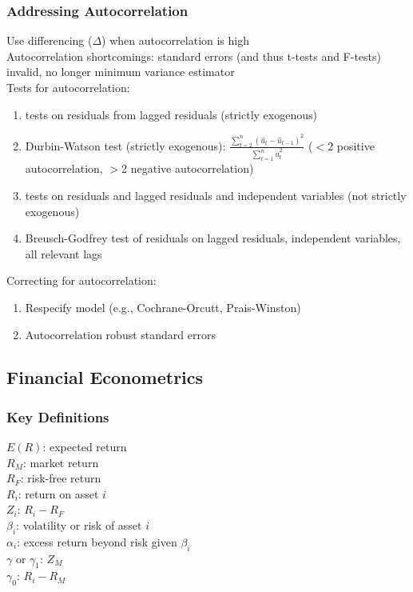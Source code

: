 \documentclass[12pt]{article}
\numberwithin{equation}{section}
\begin{document}
\subsubsection{Addressing Autocorrelation}
Use differencing ($\Delta$) when autocorrelation is high \\[0.5cm]
Autocorrelation shortcomings: standard errors (and thus t-tests and F-tests) invalid, no longer minimum variance estimator \\[0.5cm]
Tests for autocorrelation:
\begin{enumerate}
    \item tests on residuals from lagged residuals (strictly exogenous)
    \item Durbin-Watson test (strictly exogenous): $\frac{\sum\limits_{t=2}^{n}(\hat{u}_{t}-\hat{u}_{t-1})^2}{\sum\limits_{t=1}^{n}\hat{u}_t^2}$ ($<$2 positive autocorrelation, $>$2 negative autocorrelation)
    \item tests on residuals and lagged residuals and independent variables (not strictly exogenous)
    \item Breusch-Godfrey test of residuals on lagged residuals, independent variables, all relevant lags
\end{enumerate}

Correcting for autocorrelation:
\begin{enumerate}
    \item Respecify model (e.g., Cochrane-Orcutt, Prais-Winston)
    \item Autocorrelation robust standard errors
\end{enumerate}

\subsection{Financial Econometrics}

\subsubsection{Key Definitions}

$E(R)$: expected return \\
$R_M$: market return \\
$R_F$: risk-free return \\
$R_i$: return on asset $i$ \\
$Z_i$: $R_i - R_F$ \\
$\beta_i$: volatility or risk of asset $i$ \\
$\alpha_i$: excess return beyond risk given $\beta_i$ \\
$\gamma$ or $\gamma_1$: $Z_M$ \\
$\gamma_0$: $R_i-R_M$
\end{document}
